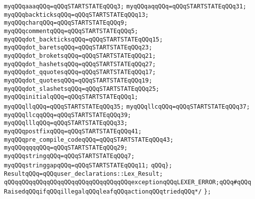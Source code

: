 \newline
\verb|myqQQqaaaqQQq=qQQqSTARTSTATEqQQq3;|\newline
\verb|myqQQqaqqQQq=qQQqSTARTSTATEqQQq31;|\newline
\verb|myqQQqbackticksqQQq=qQQqSTARTSTATEqQQq13;|\newline
\verb|myqQQqcharqQQq=qQQqSTARTSTATEqQQq9;|\newline
\verb|myqQQqcommentqQQq=qQQqSTARTSTATEqQQq5;|\newline
\verb|myqQQqdot_backticksqQQq=qQQqSTARTSTATEqQQq15;|\newline
\verb|myqQQqdot_baretsqQQq=qQQqSTARTSTATEqQQq23;|\newline
\verb|myqQQqdot_broketsqQQq=qQQqSTARTSTATEqQQq21;|\newline
\verb|myqQQqdot_hashetsqQQq=qQQqSTARTSTATEqQQq27;|\newline
\verb|myqQQqdot_qquotesqQQq=qQQqSTARTSTATEqQQq17;|\newline
\verb|myqQQqdot_quotesqQQq=qQQqSTARTSTATEqQQq19;|\newline
\verb|myqQQqdot_slashetsqQQq=qQQqSTARTSTATEqQQq25;|\newline
\verb|myqQQqinitialqQQq=qQQqSTARTSTATEqQQq1;|\newline
\verb|myqQQqllqQQq=qQQqSTARTSTATEqQQq35;|\newline
\verb|myqQQqllcqQQq=qQQqSTARTSTATEqQQq37;|\newline
\verb|myqQQqllcqqQQq=qQQqSTARTSTATEqQQq39;|\newline
\verb|myqQQqlllqQQq=qQQqSTARTSTATEqQQq33;|\newline
\verb|myqQQqpostfixqQQq=qQQqSTARTSTATEqQQq41;|\newline
\verb|myqQQqpre_compile_codeqQQq=qQQqSTARTSTATEqQQq43;|\newline
\verb|myqQQqqqqqQQq=qQQqSTARTSTATEqQQq29;|\newline
\verb|myqQQqstringqQQq=qQQqSTARTSTATEqQQq7;|\newline
\verb|myqQQqstringgapqQQq=qQQqSTARTSTATEqQQq11;|\newline
\newline
\verb|qQQq};|\newline
\verb|ResultqQQq=qQQquser_declarations::Lex_Result;|\newline
\verb|qQQqqQQqqQQqqQQqqQQqqQQqqQQqqQQqqQQqexceptionqQQqLEXER_ERROR;qQQq#qQQqRaisedqQQqifqQQqillegalqQQqleafqQQqactionqQQqtriedqQQq*/|\newline
\verb|};|\newline
\newline
